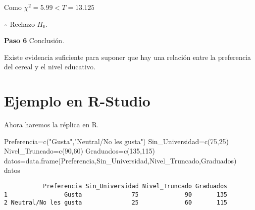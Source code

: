 \documentclass[
  a4paper,
  oneside,
  openany]{book}
\newenvironment{Shaded}{\begin{snugshade}}{\end{snugshade}}
\newcommand{\DecValTok}[1]{\textcolor[rgb]{0.00,0.00,0.81}{#1}}
\newcommand{\FunctionTok}[1]{\textcolor[rgb]{0.00,0.00,0.00}{#1}}
\newcommand{\NormalTok}[1]{#1}
\newcommand{\OtherTok}[1]{\textcolor[rgb]{0.56,0.35,0.01}{#1}}
\newcommand{\StringTok}[1]{\textcolor[rgb]{0.31,0.60,0.02}{#1}}
\begin{document}
Como \(\chi^2=5.99 < T=13.125\)

\(\therefore\) Rechazo \(H_0\).

\textbf{Paso 6} Conclusión.

Existe evidencia suficiente para suponer que hay una relación entre la preferencia del cereal y el nivel educativo.

\hypertarget{ejemplo-en-r-studio-10}{%
\section{Ejemplo en R-Studio}\label{ejemplo-en-r-studio-10}}

Ahora haremos la réplica en R.

\begin{Shaded}
\begin{Highlighting}[]
\NormalTok{Preferencia}\OtherTok{=}\FunctionTok{c}\NormalTok{(}\StringTok{"Gusta"}\NormalTok{,}\StringTok{"Neutral/No les gusta"}\NormalTok{)}
\NormalTok{Sin\_Universidad}\OtherTok{=}\FunctionTok{c}\NormalTok{(}\DecValTok{75}\NormalTok{,}\DecValTok{25}\NormalTok{)}
\NormalTok{Nivel\_Truncado}\OtherTok{=}\FunctionTok{c}\NormalTok{(}\DecValTok{90}\NormalTok{,}\DecValTok{60}\NormalTok{)}
\NormalTok{Graduados}\OtherTok{=}\FunctionTok{c}\NormalTok{(}\DecValTok{135}\NormalTok{,}\DecValTok{115}\NormalTok{)}
\NormalTok{datos}\OtherTok{=}\FunctionTok{data.frame}\NormalTok{(Preferencia,Sin\_Universidad,Nivel\_Truncado,Graduados)}
\NormalTok{datos}
\end{Highlighting}
\end{Shaded}

\begin{verbatim}
           Preferencia Sin_Universidad Nivel_Truncado Graduados
1                Gusta              75             90       135
2 Neutral/No les gusta              25             60       115
\end{verbatim}
\end{document}
